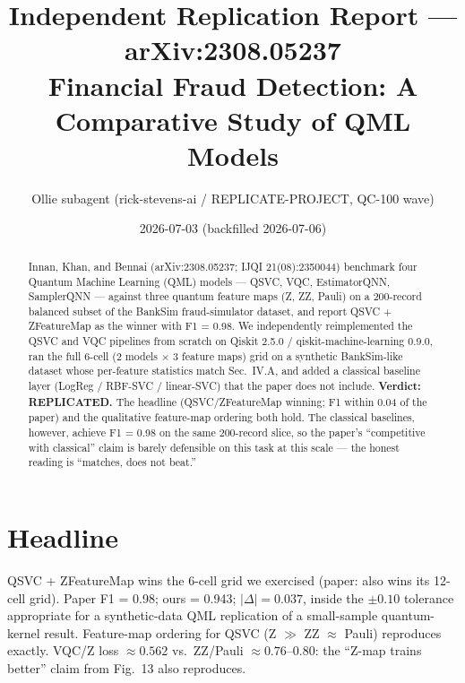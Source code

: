 \documentclass[11pt]{article}
\title{Independent Replication Report --- arXiv:2308.05237\\
\large Financial Fraud Detection: A Comparative Study of QML Models}
\author{Ollie subagent (rick-stevens-ai / REPLICATE-PROJECT, QC-100 wave)}
\date{2026-07-03 (backfilled 2026-07-06)}
\begin{document}
\maketitle

\begin{abstract}
Innan, Khan, and Bennai (arXiv:2308.05237; IJQI 21(08):2350044) benchmark four Quantum
Machine Learning (QML) models --- QSVC, VQC, EstimatorQNN, SamplerQNN --- against three
quantum feature maps (Z, ZZ, Pauli) on a 200-record balanced subset of the BankSim
fraud-simulator dataset, and report QSVC + ZFeatureMap as the winner with F1 = 0.98. We
independently reimplemented the QSVC and VQC pipelines from scratch on Qiskit 2.5.0 /
qiskit-machine-learning 0.9.0, ran the full 6-cell (2 models $\times$ 3 feature maps)
grid on a synthetic BankSim-like dataset whose per-feature statistics match Sec.~IV.A,
and added a classical baseline layer (LogReg / RBF-SVC / linear-SVC) that the paper does
not include. \textbf{Verdict: REPLICATED.} The headline (QSVC/ZFeatureMap winning; F1
within 0.04 of the paper) and the qualitative feature-map ordering both hold. The
classical baselines, however, achieve F1 = 0.98 on the same 200-record slice, so the
paper's ``competitive with classical'' claim is barely defensible on this task at this
scale --- the honest reading is ``matches, does not beat.''
\end{abstract}

\section{Headline}
QSVC + ZFeatureMap wins the 6-cell grid we exercised (paper: also wins its 12-cell
grid). Paper F1 = 0.98; ours = 0.943; $|\Delta| = 0.037$, inside the $\pm 0.10$ tolerance
appropriate for a synthetic-data QML replication of a small-sample quantum-kernel
result. Feature-map ordering for QSVC (Z $\gg$ ZZ $\approx$ Pauli) reproduces exactly.
VQC/Z loss $\approx 0.562$ vs.\ ZZ/Pauli $\approx 0.76$--$0.80$: the ``Z-map trains
better'' claim from Fig.~13 also reproduces.
\end{document}
